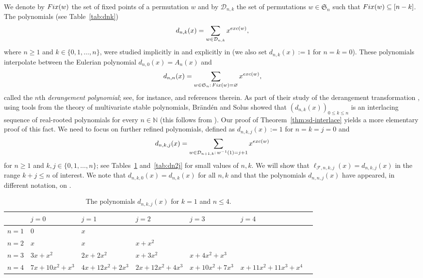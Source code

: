 \documentclass[11pt]{amsart}
\newcommand{\exc}{{\rm exc}}
\newcommand{\Fix}{{\rm Fix}}
\newcommand{\dD}{{\mathcal D}}
\newcommand{\fF}{{\mathcal F}}
\newcommand{\fS}{{\mathfrak S}}
\newcommand{\NN}{{\mathbb N}}
\begin{document}
We denote by $\Fix(w)$ the set of fixed points of 
a permutation $w$ and by $\dD_{n,k}$ the set of 
permutations $w \in \fS_n$ such that $\Fix(w) 
\subseteq [n-k]$. The polynomials (see 
Table~\ref{tab:dnk})
%
\begin{equation} \label{eq:def-dnk}
d_{n,k}(x) = \sum_{w \in \dD_{n,k}} x^{\exc(w)},
\end{equation}
%
where $n \ge 1$ and $k \in \{0, 1,\dots,n\}$, 
were studied implicitly in 
\cite[Section~3.2]{BS21} and explicitly in 
\cite[Section~4]{Ath23+} (we also set $d_{n,k}
(x) := 1$ for $n=k=0$). These polynomials 
interpolate between the Eulerian polynomial 
$d_{n,0}(x) = A_n(x)$ and 
%
\[ d_{n,n}(x) = \sum_{w \in \fS_n: \, \Fix(w) = 
   \varnothing} x^{\exc(w)}, \]
%
called the $n$th \emph{derangement polynomial};
see, for instance, \cite[Section~3.2]{BS21} 
\cite{GS20, HZ19} and references therein. As
part of their study of the derangement 
transformation \cite[Section~3.2]{BS21}, using 
tools from the theory of multivariate stable 
polynomials, Br\"and\'en and Solus showed that 
$(d_{n,k}(x))_{0 \le k \le n}$ is an interlacing 
sequence of real-rooted polynomials for every 
$n \in \NN$ (this follows from 
\cite[Theorem~3.6]{BS21}). Our proof of 
Theorem~\ref{thm:sd-interlace} yields a more 
elementary proof of this fact. We need to focus 
on further refined polynomials, defined as
$d_{n,k,j}(x) := 1$ for $n=k=j=0$ and
%
\begin{equation} \label{eq:def-dnkj}
d_{n,k,j}(x) = \sum_{w \in \dD_{n+1,k}: \, 
               w^{-1}(1) = j+1} x^{\exc(w)} 
\end{equation}
%
for $n \ge 1$ and $k, j \in \{0, 1,\dots,n\}$;
see Tables~\ref{tab:dn1j} and~\ref{tab:dn2j} 
for small values of $n, k$. 
We will show that $\ell_{\fF,n,k,j}(x) = 
d_{n,k,j}(x)$ in the range $k + j \le n$ of 
interest. We note that $d_{n,k,0}(x) = d_{n,k}
(x)$ for all $n,k$ and that the polynomials 
$d_{n,n,j}(x)$ have appeared, in different  
notation, on \cite[p.~46]{HZ19}.

{\scriptsize
\begin{table}[hptb]
\begin{center}
\begin{tabular}{| l || l | l | l | l | l | l ||} 
       \hline
& $j=0$ & $j=1$ & $j=2$ & $j=3$ & $j=4$ \\ \hline 
          \hline
$n=1$  & 0 & $x$ & & & \\ \hline
$n=2$  & $x$ & $x$ & $x+x^2$ & & \\ \hline
$n=3$  & $3x+x^2$ & $2x+2x^2$ & $x+3x^2$ & 
         $x+4x^2+x^3$ & \\ \hline
$n=4$  & $7x+10x^2+x^3$ & $4x+12x^2+2x^3$ & 
         $2x+12x^2+4x^3$ & $x+10x^2+7x^3$ & 
				 $x+11x^2+11x^3+x^4$ \\ \hline
\end{tabular}

\bigskip
\caption{The polynomials $d_{n,k,j}(x)$ for $k=1$ 
         and $n \le 4$.}
\label{tab:dn1j}
\end{center}
\end{table}}
\end{document}
